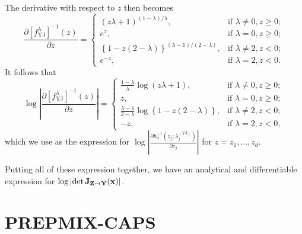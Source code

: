 \documentclass{statsmsc}
\begin{document}
{The derivative with respect to $z$ then becomes
\begin{equation}
    \frac{\partial \left[f_{\textrm{YJ}}^\lambda\right]^{-1}(z)}{\partial z}= \left\{
        \begin{array}{ll}
            (z \lambda + 1)^{(1-\lambda)/\lambda}, & \textrm{if } \lambda \neq 0, z \geq 0; \\
            e^z, & \textrm{if } \lambda = 0, z \geq 0;  \\
            \left\{1-z(2-\lambda)\right\}^{(\lambda-1)/(2-\lambda)} , & \textrm{if } \lambda \neq 2, z < 0; \\
            e^{-z}, & \textrm{if } \lambda=2, z < 0.
        \end{array}
    \right.
\end{equation}
It follows that
\begin{equation}
    \log \left|\frac{\partial \left[f_{\textrm{YJ}}^\lambda\right]^{-1}(z)}{\partial z} \right|= \left\{
        \begin{array}{ll}
            \frac{1-\lambda}{\lambda}\log (z \lambda + 1), & \textrm{if } \lambda \neq 0, z \geq 0; \\
            z, & \textrm{if } \lambda = 0, z \geq 0;  \\
            \frac{\lambda - 1}{2-\lambda}\log\left\{1-z(2-\lambda)\right\} , & \textrm{if } \lambda \neq 2, z < 0; \\
            -z, & \textrm{if } \lambda=2, z < 0,
        \end{array}
    \right.
\end{equation}
which we use as the expression for $\log \left| \frac{\partial h_4^{-1}\left(z_j;\lambda_j^{(\textrm{YJ})}\right)}{\partial z_j} \right|$ for $z=z_1,\dots,z_d$.

Putting all of these expression together, we have an analytical and differentiable expression
for $\log\left| \det \mathbf{J}_{\mathbf{Z} \rightarrow {\mathbf{Y}}}(\mathbf{x}) \right|$.



\section{PREPMIX-CAPS}%
\label{sec:PREPMIX-CAPS-method}



}
\end{document}
